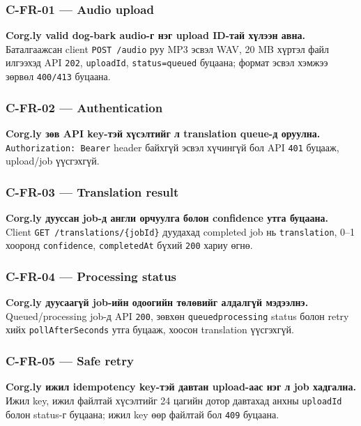 \documentclass[
  mongolian,
]{article}
\begin{document}
\subsubsection{C-FR-01 --- Audio upload}\label{c-fr-01-audio-upload}

\textbf{Corg.ly valid dog-bark audio-г нэг upload ID-тай хүлээн авна.}
Баталгаажсан client \texttt{POST\ /audio} руу MP3 эсвэл WAV, 20 MB
хүртэл файл илгээхэд API \texttt{202}, \texttt{uploadId},
\texttt{status=queued} буцаана; формат эсвэл хэмжээ зөрвөл
\texttt{400/413} буцаана.

\subsubsection{C-FR-02 --- Authentication}\label{c-fr-02-authentication}

\textbf{Corg.ly зөв API key-тэй хүсэлтийг л translation queue-д
оруулна.} \texttt{Authorization:\ Bearer} header байхгүй эсвэл хүчингүй
бол API \texttt{401} буцааж, upload/job үүсгэхгүй.

\subsubsection{C-FR-03 --- Translation
result}\label{c-fr-03-translation-result}

\textbf{Corg.ly дууссан job-д англи орчуулга болон confidence утга
буцаана.} Client \texttt{GET\ /translations/\{jobId\}} дуудахад
completed job нь \texttt{translation}, 0--1 хооронд \texttt{confidence},
\texttt{completedAt} бүхий \texttt{200} хариу өгнө.

\subsubsection{C-FR-04 --- Processing
status}\label{c-fr-04-processing-status}

\textbf{Corg.ly дуусаагүй job-ийн одоогийн төлөвийг алдалгүй мэдээлнэ.}
Queued/processing job-д API \texttt{200}, зөвхөн
\texttt{queued\textbar{}processing} status болон retry хийх
\texttt{pollAfterSeconds} утга буцааж, хоосон translation үүсгэхгүй.

\subsubsection{C-FR-05 --- Safe retry}\label{c-fr-05-safe-retry}

\textbf{Corg.ly ижил idempotency key-тэй давтан upload-аас нэг л job
хадгална.} Ижил key, ижил файлтай хүсэлтийг 24 цагийн дотор давтахад
анхны \texttt{uploadId} болон status-г буцаана; ижил key өөр файлтай бол
\texttt{409} буцаана.
\end{document}
